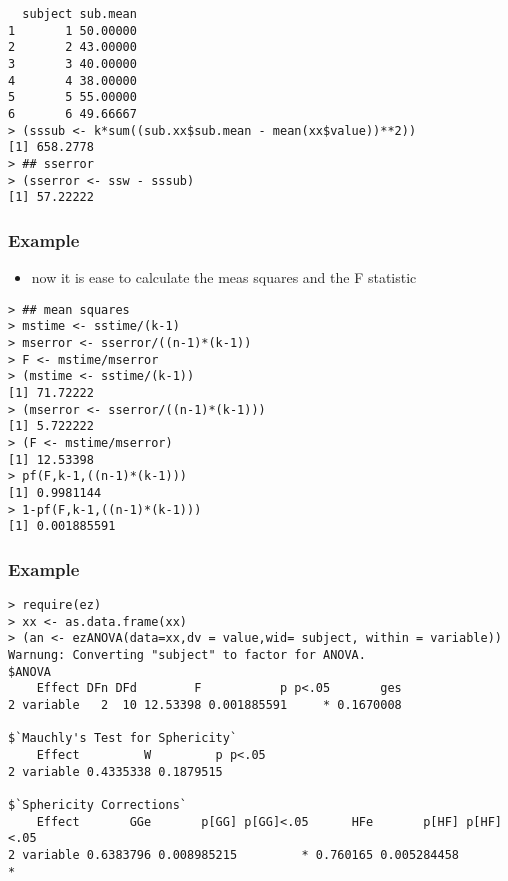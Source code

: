 \begin{frame}
\begin{verbatim}
  subject sub.mean
1       1 50.00000
2       2 43.00000
3       3 40.00000
4       4 38.00000
5       5 55.00000
6       6 49.66667
> (sssub <- k*sum((sub.xx$sub.mean - mean(xx$value))**2))
[1] 658.2778
> ## sserror
> (sserror <- ssw - sssub)
[1] 57.22222
\end{verbatim}
\end{frame}


\begin{frame}\frametitle{Example}
  \begin{itemize}
  \item now it is ease to calculate the meas squares and the F statistic
  \end{itemize}\footnotesize
\begin{verbatim}
> ## mean squares
> mstime <- sstime/(k-1)
> mserror <- sserror/((n-1)*(k-1))
> F <- mstime/mserror
> (mstime <- sstime/(k-1))
[1] 71.72222
> (mserror <- sserror/((n-1)*(k-1)))
[1] 5.722222
> (F <- mstime/mserror)
[1] 12.53398
> pf(F,k-1,((n-1)*(k-1)))
[1] 0.9981144
> 1-pf(F,k-1,((n-1)*(k-1)))
[1] 0.001885591
\end{verbatim}
\end{frame}

\begin{frame}\frametitle{Example}
\begin{verbatim}
> require(ez)
> xx <- as.data.frame(xx)
> (an <- ezANOVA(data=xx,dv = value,wid= subject, within = variable))
Warnung: Converting "subject" to factor for ANOVA.
$ANOVA
    Effect DFn DFd        F           p p<.05       ges
2 variable   2  10 12.53398 0.001885591     * 0.1670008

$`Mauchly's Test for Sphericity`
    Effect         W         p p<.05
2 variable 0.4335338 0.1879515      

$`Sphericity Corrections`
    Effect       GGe       p[GG] p[GG]<.05      HFe       p[HF] p[HF]<.05
2 variable 0.6383796 0.008985215         * 0.760165 0.005284458         *

\end{verbatim}
\end{frame}
